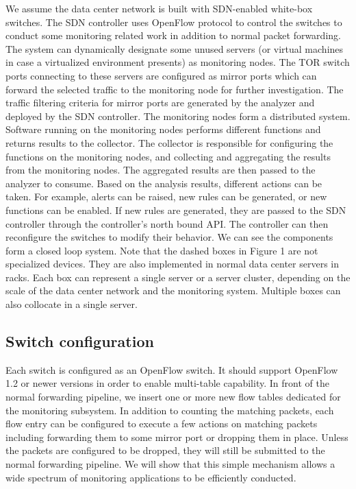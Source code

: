 \documentclass{acm_proc_article-sp}
\begin{document}
We assume the data center network is built with SDN-enabled white-box switches. The SDN controller uses OpenFlow protocol to control the switches to conduct some monitoring related work in addition to normal packet forwarding. The system can dynamically designate some unused servers (or virtual machines in case a virtualized environment presents) as monitoring nodes. The TOR switch ports connecting to these servers are configured as mirror ports which can forward the selected traffic to the monitoring node for further investigation. The traffic filtering criteria for mirror ports are generated by the analyzer and deployed by the SDN controller. The monitoring nodes form a distributed system. Software running on the monitoring nodes performs different functions and returns results to the collector. The collector is responsible for configuring the functions on the monitoring nodes, and collecting and aggregating the results from the monitoring nodes. The aggregated results are then passed to the analyzer to consume. Based on the analysis results, different actions can be taken. For example, alerts can be raised, new rules can be generated, or new functions can be enabled. If new rules are generated, they are passed to the SDN controller through the controller’s north bound API. The controller can then reconfigure the switches to modify their behavior. We can see the components form a closed loop system. Note that the dashed boxes in Figure 1 are not specialized devices. They are also implemented in normal data center servers in racks. Each box can represent a single server or a server cluster, depending on the scale of the data center network and the monitoring system. Multiple boxes can also collocate in a single server.\\
\subsection{Switch configuration}
Each switch is configured as an OpenFlow switch. It should support OpenFlow 1.2 or newer versions in order to enable multi-table capability. In front of the normal forwarding pipeline, we insert one or more new flow tables dedicated for the monitoring subsystem. In addition to counting the matching packets, each flow entry can be configured to execute a few actions on matching packets including forwarding them to some mirror port or dropping them in place. Unless the packets are configured to be dropped, they will still be submitted to the normal forwarding pipeline. We will show that this simple mechanism allows a wide spectrum of monitoring applications to be efficiently conducted.\\
\end{document}
